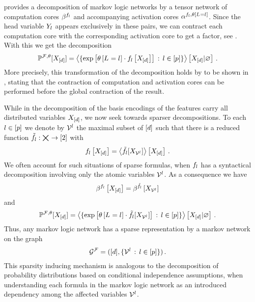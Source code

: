  provides a decomposition of markov logic networks by a tensor network of computation cores $\beta^{f_{l}}$ and accompanying activation cores $\alpha^{f_{l},\theta\left[L_{}=l_{}\right]}$.
Since the head variable $Y_{l}$ appears exclusively in these pairs, we can contract each computation core with the corresponding activation core to get a factor, see .
With this we get the decomposition
\begin{align*}
	\mathbb{P}^{\mathcal{F},\theta}[X_{[d]}]
	= \left\langle \{\mathrm{exp}\left[\theta\left[L_{}=l_{}\right]\cdot f_{l}\left[X_{[d]}\right]\right] \, : \, l\in[p]\}\right\rangle \left[ X_{[d]} | \varnothing \right] \, .
\end{align*}
More precisely, this transformation of the decomposition holds by  to be shown in , stating that the contraction of computation and activation cores can be performed before the global contraction of the result. 

While in the decomposition of  the basis encodings of the features carry all distributed variables $X_{[d]}$, we now seek towards sparser decompositions.
To each $l\in[p]$ we denote by $\mathcal{V}^{l}$ the maximal subset of $[d]$ such that there is a reduced function
$\tilde{f}_{l} : \bigtimes_{} \rightarrow [2]$
with
\begin{align*}
	f_{l}\left[X_{[d]}\right]
	= \left\langle \tilde{f}_{l}[X_{\mathcal{V}^{l}}]\right\rangle \left[ X_{[d]} \right] \, .
\end{align*}
We often account for such situations of sparse formulas, when $f_{l}$ has a syntactical decomposition involving only the atomic variables $\mathcal{V}^{l}$.
As a consequence we have
\begin{align*}
	\beta^{f_{l}}\left[X_{[d]}\right]
	= \beta^{\tilde{f}_{l}}\left[X_{\mathcal{V}^{l}}\right]
\end{align*}
and
\begin{align*}
	\mathbb{P}^{\mathcal{F},\theta}[X_{[d]}]
	= \left\langle \{\mathrm{exp}\left[\theta\left[L_{}=l_{}\right]\cdot\tilde{f}_{l}[X_{\mathcal{V}^{l}}]\right] \, : \, l\in[p]\}\right\rangle \left[ X_{[d]} | \varnothing \right] \, .
\end{align*}
Thus, any markov logic network has a sparse representation by a markov network on the graph
\begin{align*}
	\mathcal{G}^{\mathcal{F}} = ([d],\{\mathcal{V}^{l} \, : \, l\in[p]\}) \, .
\end{align*}
This sparsity inducing mechanism is analogous to the decomposition of probability distributions based on conditional independence assumptions, when understanding each formula in the markov logic network as an introduced dependency among the affected variables $\mathcal{V}^{l}$.


